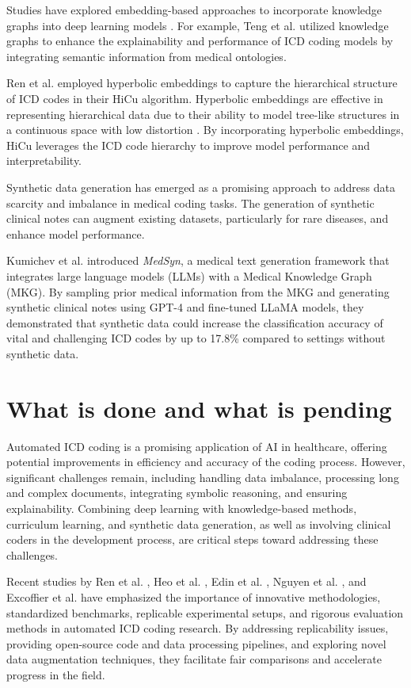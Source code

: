 \documentclass[12pt,a4paper]{report}
\begin{document}
Studies have explored embedding-based approaches to incorporate knowledge graphs into deep learning models \cite{teng2020explainable, xie2019ehr}. For example, Teng et al. \cite{teng2020explainable} utilized knowledge graphs to enhance the explainability and performance of ICD coding models by integrating semantic information from medical ontologies.

Ren et al. \cite{ren2022hicu} employed hyperbolic embeddings to capture the hierarchical structure of ICD codes in their HiCu algorithm. Hyperbolic embeddings are effective in representing hierarchical data due to their ability to model tree-like structures in a continuous space with low distortion \cite{nickel2017poincare}. By incorporating hyperbolic embeddings, HiCu leverages the ICD code hierarchy to improve model performance and interpretability.

Synthetic data generation has emerged as a promising approach to address data scarcity and imbalance in medical coding tasks. The generation of synthetic clinical notes can augment existing datasets, particularly for rare diseases, and enhance model performance.

Kumichev et al. \cite{kumichev2024medsyn} introduced \textit{MedSyn}, a medical text generation framework that integrates large language models (LLMs) with a Medical Knowledge Graph (MKG). By sampling prior medical information from the MKG and generating synthetic clinical notes using GPT-4 and fine-tuned LLaMA models, they demonstrated that synthetic data could increase the classification accuracy of vital and challenging ICD codes by up to 17.8\% compared to settings without synthetic data.

\section{What is done and what is pending}

Automated ICD coding is a promising application of AI in healthcare, offering potential improvements in efficiency and accuracy of the coding process. However, significant challenges remain, including handling data imbalance, processing long and complex documents, integrating symbolic reasoning, and ensuring explainability. Combining deep learning with knowledge-based methods, curriculum learning, and synthetic data generation, as well as involving clinical coders in the development process, are critical steps toward addressing these challenges.

Recent studies by Ren et al. \cite{ren2022hicu}, Heo et al. \cite{heo2022medical}, Edin et al. \cite{edin2023automated, edin2024unsupervised}, Nguyen et al. \cite{nguyen2023mimic}, and Excoffier et al. \cite{excoffier2024generalist} have emphasized the importance of innovative methodologies, standardized benchmarks, replicable experimental setups, and rigorous evaluation methods in automated ICD coding research. By addressing replicability issues, providing open-source code and data processing pipelines, and exploring novel data augmentation techniques, they facilitate fair comparisons and accelerate progress in the field.
\end{document}
